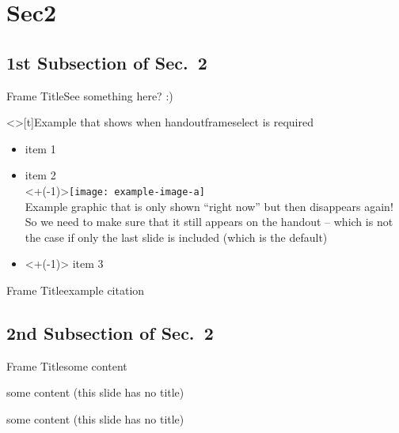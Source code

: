 \section{Sec2}\label{sec:two}

\subsection{1st Subsection of Sec.\ 2}

\begin{frame}{Frame Title}See something here? :)\end{frame}

\begin{handoutframeselect}[2,3]
\begin{frame}<>[t]{Example that shows when handoutframeselect is required}
\vspace{1.5cm}
\begin{itemize}[<+->]
  \item item 1
	\item item 2\\
	\only<+(-1)>{\texttt{[image: example-image-a]}\\} Example graphic that is only shown "`right now"' but then disappears again! So we need to make sure that it still appears on the handout -- which is not the case if only the last slide is included (which is the default)
	\item<+(-1)> item 3
\end{itemize}
\end{frame}
\end{handoutframeselect}

\begin{frame}{Frame Title}example citation \cite{AmnestyBook}\end{frame}

\subsection{2nd Subsection of Sec.\ 2}

\begin{frame}{Frame Title}some content\end{frame}
\begin{frame}some content (this slide has no title)\end{frame}
\begin{frame}some content (this slide has no title)\end{frame}

